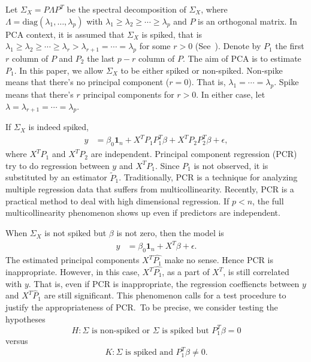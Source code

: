 \documentclass[review]{elsarticle}
\theoremstyle{plain}
\theoremstyle{definition}
\theoremstyle{remark}
\begin{document}
Let $\Sigma_X=P\Lambda P^T$ be the spectral decomposition of $\Sigma_X$, where $\Lambda=\textrm{diag}(\lambda_1,\ldots,\lambda_p)$ with $\lambda_1\geq \lambda_2\geq \cdots \geq \lambda_p$ and $P$ is an orthogonal matrix.
In PCA context, it is assumed that $\Sigma_X$ is spiked, that is $\lambda_1\geq \lambda_2\geq \cdots \geq\lambda_r> \lambda_{r+1}=\cdots =\lambda_p$ for some $r>0$
(See~\cite{Cai2012Sparse}). Denote by $P_1$ the first $r$ column of $P$ and $P_2$ the last $p-r$ column of $P$. The aim of PCA is to estimate $P_1$.
In this paper, we allow $\Sigma_X$ to be either spiked or non-spiked. Non-spike means that there's no principal component ($r=0$). That is, $\lambda_1=\cdots = \lambda_p$. Spike means that there's $r$ principal components for $r>0$. 
In either case, let $\lambda=\lambda_{r+1}=\cdots=\lambda_{p}$.

If $\Sigma_X$ is indeed spiked,
\begin{equation*}
    \begin{aligned}
        y&=\beta_0 \textbf{1}_n+X^T P_1P_1^T\beta+X^T P_2 P_2^T\beta+\epsilon,
    \end{aligned}
\end{equation*}
where $X^T P_1$ and $X^T P_2$ are independent.
Principal component regression (PCR) try to do regression between $y$ and $X^T P_1$. Since $P_1$ is not observed, it is substituted by an estimator $\tilde{P}_1$. 
Traditionally, PCR is a technique for analyzing multiple regression data that suffers from multicollinearity. Recently, PCR is a practical method to deal with high dimensional regression. If $p<n$, the full multicollinearity phenomenon shows up even if predictors are independent. 

When $\Sigma_X$ is not spiked but $\beta$ is not zero, then the model is
\begin{equation*}
    \begin{aligned}
        y&=\beta_0 \textbf{1}_n+X^T \beta+\epsilon.
    \end{aligned}
\end{equation*}
The estimated principal components $X^T\hat{P_1}$ make no sense. Hence PCR is inappropriate. However, in this case, $X^T\hat{P_1}$, as a part of $X^T$, is still correlated with $y$. That is, even if PCR is inappropriate, the regression coeffiencts between $y$ and $X^T \hat{P}_1$ are still significant. This phenomenon calls for a test procedure to justify the appropriateness of PCR.\ 
To be precise, we consider testing the hypotheses
\begin{equation*}
    H:\Sigma\,\,\textrm{is non-spiked or}\,\,\Sigma\,\,\textrm{is spiked but}\,\, P_1^T \beta =0 
\end{equation*}
versus
\begin{equation*}
    K: \Sigma\,\,\textrm{is spiked and}\,\, P_1^T \beta \neq 0.
\end{equation*}
\end{document}
